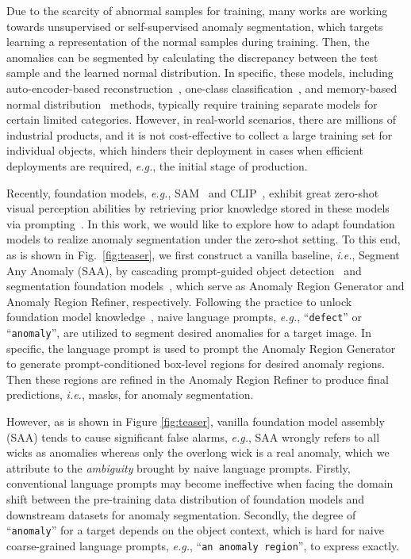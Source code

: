 Due to the scarcity of abnormal samples for training, many works are working towards unsupervised or self-supervised anomaly segmentation, which targets learning a representation of the normal samples during training. Then, the anomalies can be segmented by calculating the discrepancy between the test sample and the learned normal distribution. In specific, these models, including auto-encoder-based reconstruction~\cite{zhou2020encoding,hou2021divide,zavrtanik2021draem,matsubara2020deep,yan2021learning,jiang2022masked}, one-class classification~\cite{yi2020patch,massoli2021mocca,sohn2020learning}, and memory-based normal distribution~\cite{roth2022towards, wan_industrial_2022, cao2023complementary, wang_multimodal_nodate, jiang_softpatch_2022} methods, typically require training separate models for certain limited categories. However, in real-world scenarios, there are millions of industrial products, and it is not cost-effective to collect a large training set for individual objects, which hinders their deployment in cases when efficient deployments are required, \textit{e.g.}, the initial stage of production.

Recently, foundation models, \textit{e.g.}, SAM~\cite{kirillov2023segment} and CLIP~\cite{radford2021learning}, exhibit great zero-shot visual perception abilities by retrieving prior knowledge stored in these models via prompting~\cite{li2022align, bommasani2021opportunities}.  In this work, we would like to explore how to adapt foundation models to realize anomaly segmentation under the zero-shot setting. To this end, as is shown in Fig.~\ref{fig:teaser}, we first construct a vanilla baseline, \textit{i.e.}, Segment Any Anomaly (SAA), by cascading prompt-guided object detection~\cite{liu2023grounding} and segmentation foundation models~\cite{kirillov2023segment}, which serve as Anomaly Region Generator and Anomaly Region Refiner, respectively. Following the practice to unlock foundation model knowledge~\cite{clipseg2022,jeong2023winclip}, naive language prompts, \textit{e.g.}, ``\verb|defect|'' or ``\verb|anomaly|'', are utilized to segment desired anomalies for a target image. In specific, the language prompt is used to prompt the Anomaly Region Generator to generate prompt-conditioned box-level regions for desired anomaly regions. Then these regions are refined in the Anomaly Region Refiner to produce final predictions, \textit{i.e.}, masks, for anomaly segmentation. 

However, as is shown in Figure \ref{fig:teaser}, vanilla foundation model assembly (SAA) tends to cause significant false alarms, \textit{e.g.}, SAA wrongly refers to all wicks as anomalies whereas only the overlong wick is a real anomaly, which we attribute to the \textit{ambiguity} brought by naive language prompts. Firstly, conventional language prompts may become ineffective when facing the domain shift between the pre-training data distribution of foundation models and downstream datasets for anomaly segmentation. Secondly, the degree of ``\verb|anomaly|'' for a target depends on the object context, which is hard for naive coarse-grained language prompts, \textit{e.g.}, ``\verb|an anomaly region|'', to express exactly.

